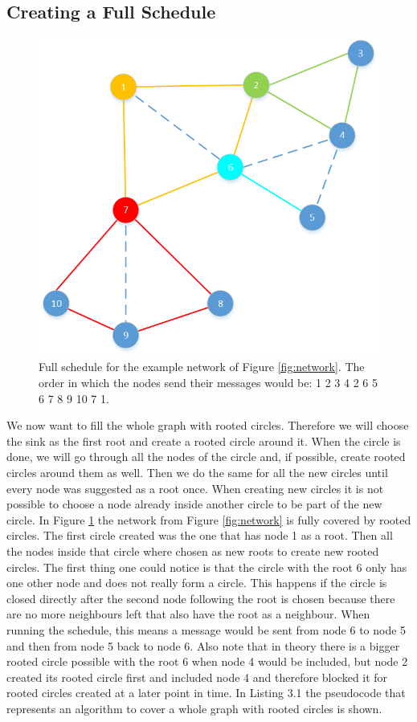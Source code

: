 \subsection{Creating a Full Schedule}
\begin{figure}[htbp]
	\centering         
    \includegraphics[scale=0.6]{content/images/Schedule/FullSchedule}
    \caption{Full schedule for the example network of Figure \ref{fig:network}. The order in which the nodes send their messages would be: 1 2 3 4 2 6 5 6 7 8 9 10 7 1.}
    \label{fig:schedule}
\end{figure} 
We now want to fill the whole graph with rooted circles. Therefore we will choose the sink as the first root and create a rooted circle around it. When the circle is done, we will go through all the nodes of the circle and, if possible, create rooted circles around them as well. Then we do the same for all the new circles until every node was suggested as a root once. When creating new circles it is not possible to choose a node already inside another circle to be part of the new circle. In Figure \ref{fig:schedule} the network from Figure \ref{fig:network} is fully covered by rooted circles. The first circle created was the one that has node 1 as a root. Then all the nodes inside that circle where chosen as new roots to create new rooted circles. The first thing one could notice is that the circle with the root 6 only has one other node and does not really form a circle. This happens if the circle is closed directly after the second node following the root is chosen because there are no more neighbours left that also have the root as a neighbour. When running the schedule, this means a message would be sent from node 6 to node 5 and then from node 5 back to node 6. Also note that in theory there is a bigger rooted circle possible with the root 6 when node 4 would be included, but node 2 created its rooted circle first and included node 4 and therefore blocked it for rooted circles created at a later point in time. In Listing 3.1 the pseudocode that represents an algorithm to cover a whole graph with rooted circles is shown.


